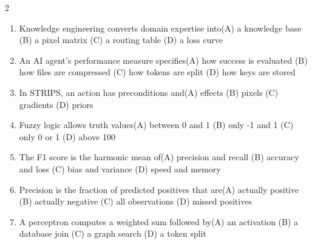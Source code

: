 \documentclass[a4paper]{article}
\begin{document}
\begin{multicols*}{2}
\begin{enumerate}[resume]
\item Knowledge engineering converts domain expertise into\newline\hspace*{0.6em}(A) a knowledge base \quad (B) a pixel matrix \newline\hspace*{0.6em}(C) a routing table \quad (D) a loss curve
\item An AI agent's performance measure specifies\newline\hspace*{0.6em}(A) how success is evaluated \quad (B) how files are compressed \newline\hspace*{0.6em}(C) how tokens are split \quad (D) how keys are stored
\item In STRIPS, an action has preconditions and\newline\hspace*{0.6em}(A) effects \quad (B) pixels \newline\hspace*{0.6em}(C) gradients \quad (D) priors
\item Fuzzy logic allows truth values\newline\hspace*{0.6em}(A) between 0 and 1 \quad (B) only -1 and 1 \newline\hspace*{0.6em}(C) only 0 or 1 \quad (D) above 100
\item The F1 score is the harmonic mean of\newline\hspace*{0.6em}(A) precision and recall \quad (B) accuracy and loss \newline\hspace*{0.6em}(C) bias and variance \quad (D) speed and memory
\item Precision is the fraction of predicted positives that are\newline\hspace*{0.6em}(A) actually positive \quad (B) actually negative \newline\hspace*{0.6em}(C) all observations \quad (D) missed positives
\item A perceptron computes a weighted sum followed by\newline\hspace*{0.6em}(A) an activation \quad (B) a database join \newline\hspace*{0.6em}(C) a graph search \quad (D) a token split

\end{enumerate}
\end{multicols*}
\end{document}
